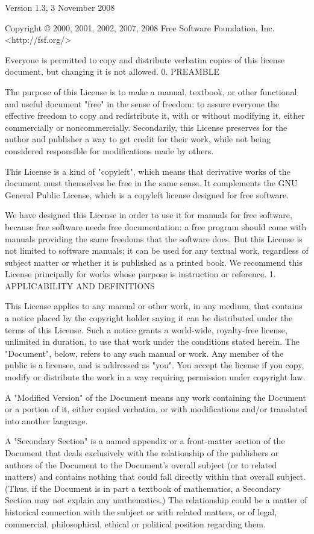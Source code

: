 {\begin{multicols}{4}
Version 1.3, 3 November 2008

Copyright © 2000, 2001, 2002, 2007, 2008 Free Software Foundation, Inc. <http://fsf.org/>

Everyone is permitted to copy and distribute verbatim copies of this license document, but changing it is not allowed.
0. PREAMBLE

The purpose of this License is to make a manual, textbook, or other functional and useful document "free" in the sense of freedom: to assure everyone the effective freedom to copy and redistribute it, with or without modifying it, either commercially or noncommercially. Secondarily, this License preserves for the author and publisher a way to get credit for their work, while not being considered responsible for modifications made by others.

This License is a kind of "copyleft", which means that derivative works of the document must themselves be free in the same sense. It complements the GNU General Public License, which is a copyleft license designed for free software.

We have designed this License in order to use it for manuals for free software, because free software needs free documentation: a free program should come with manuals providing the same freedoms that the software does. But this License is not limited to software manuals; it can be used for any textual work, regardless of subject matter or whether it is published as a printed book. We recommend this License principally for works whose purpose is instruction or reference.
1. APPLICABILITY AND DEFINITIONS

This License applies to any manual or other work, in any medium, that contains a notice placed by the copyright holder saying it can be distributed under the terms of this License. Such a notice grants a world-wide, royalty-free license, unlimited in duration, to use that work under the conditions stated herein. The "Document", below, refers to any such manual or work. Any member of the public is a licensee, and is addressed as "you". You accept the license if you copy, modify or distribute the work in a way requiring permission under copyright law.

A "Modified Version" of the Document means any work containing the Document or a portion of it, either copied verbatim, or with modifications and/or translated into another language.

A "Secondary Section" is a named appendix or a front-matter section of the Document that deals exclusively with the relationship of the publishers or authors of the Document to the Document's overall subject (or to related matters) and contains nothing that could fall directly within that overall subject. (Thus, if the Document is in part a textbook of mathematics, a Secondary Section may not explain any mathematics.) The relationship could be a matter of historical connection with the subject or with related matters, or of legal, commercial, philosophical, ethical or political position regarding them.


\end{multicols}}
